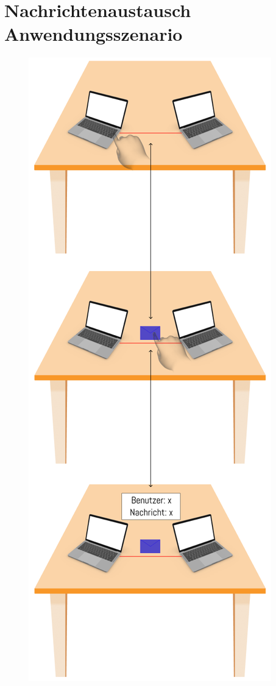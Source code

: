 \newpage

\section{Nachrichtenaustausch Anwendungsszenario}
\begin{figure}[H]
    \centering
    \includegraphics[scale=1, angle=90]{images/NachrichtenaustauschMockup}
\end{figure}
\newpage


